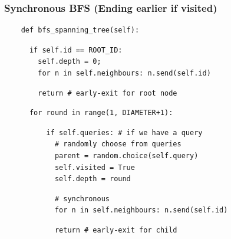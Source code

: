 \documentclass{beamer}
\begin{document}
\begin{frame}[fragile]
    \frametitle{Synchronous BFS (Ending earlier if visited)}

    \begin{verbatim}
    def bfs_spanning_tree(self):
    \end{verbatim}
    \begin{verbatim}
      if self.id == ROOT_ID:
        self.depth = 0;
        for n in self.neighbours: n.send(self.id)
    \end{verbatim}
    \begin{verbatim}
        return # early-exit for root node
    \end{verbatim}
    \begin{verbatim}
      for round in range(1, DIAMETER+1):
    \end{verbatim}
    \begin{verbatim}
          if self.queries: # if we have a query
            # randomly choose from queries
            parent = random.choice(self.query)
            self.visited = True
            self.depth = round
    \end{verbatim}
    \begin{verbatim}
            # synchronous
            for n in self.neighbours: n.send(self.id)
    \end{verbatim}
    \begin{verbatim}
            return # early-exit for child
    \end{verbatim}
\end{frame}
\end{document}
